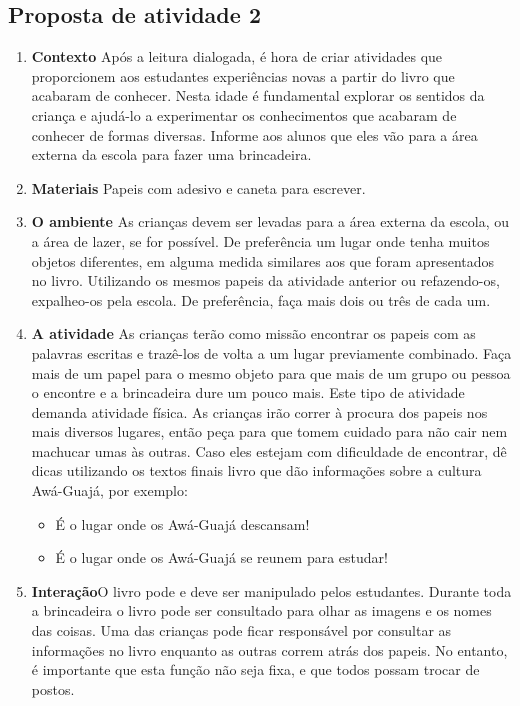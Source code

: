 \documentclass[11pt]{extarticle}
\begin{document}
\subsection{Proposta de atividade 2}

\begin{enumerate}
\item \textbf{Contexto}\quad 
Após a leitura dialogada, é hora de criar 
atividades que proporcionem aos estudantes experiências novas a partir do livro
que acabaram de conhecer. Nesta idade é fundamental explorar os sentidos da criança e 
ajudá-lo a experimentar os conhecimentos que acabaram de conhecer de formas diversas. 
Informe aos alunos que eles vão para a área externa da escola para fazer uma brincadeira. 

\item \textbf{Materiais}\quad
Papeis com adesivo e caneta para escrever.

\item \textbf{O ambiente}\quad 
As crianças devem ser levadas para a área externa da escola, ou 
a área de lazer, se for possível. De preferência um lugar onde tenha 
muitos objetos diferentes, em alguma medida similares aos que foram 
apresentados no livro. Utilizando os mesmos papeis da atividade anterior ou refazendo-os,
expalheo-os pela escola. De preferência, faça mais dois ou três de cada um.

\item \textbf{A atividade}\quad 
As crianças terão como missão encontrar os papeis com as palavras escritas 
e trazê-los de volta a um lugar previamente combinado. Faça mais de um 
papel para o mesmo objeto para que mais de um grupo ou pessoa o encontre e 
a brincadeira dure um pouco mais. Este tipo de atividade demanda atividade física. 
As crianças irão correr à procura dos papeis nos mais diversos lugares, então 
peça para que tomem cuidado para não cair nem machucar umas às outras. 
Caso eles estejam com dificuldade de encontrar, dê dicas utilizando 
os textos finais livro que dão informações sobre a cultura Awá-Guajá, por exemplo: 

\begin{itemize}
\item É o lugar onde os Awá-Guajá descansam!
\item É o lugar onde os Awá-Guajá se reunem para estudar!
\end{itemize}

\item \textbf{Interação}\quad O livro pode e deve ser 
manipulado pelos estudantes. Durante toda a brincadeira 
o livro pode ser consultado para olhar as imagens e os 
nomes das coisas. Uma das crianças pode ficar responsável
por consultar as informações no livro enquanto as outras correm
atrás dos papeis. No entanto, é importante que esta função não
seja fixa, e que todos possam trocar de postos.



\end{enumerate}
\end{document}
